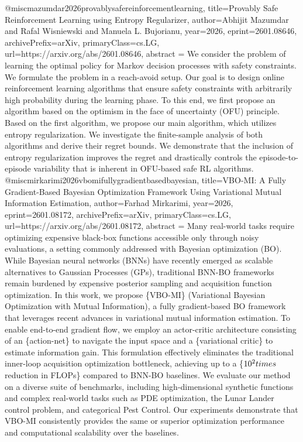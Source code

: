 {}@misc{mazumdar2026provablysafereinforcementlearning,
      title={Provably Safe Reinforcement Learning using Entropy Regularizer}, 
      author={Abhijit Mazumdar and Rafal Wisniewski and Manuela L. Bujorianu},
      year={2026},
      eprint={2601.08646},
      archivePrefix={arXiv},
      primaryClass={cs.LG},
      url={https://arxiv.org/abs/2601.08646},
      abstract = {We consider the problem of learning the optimal policy for Markov decision processes with safety constraints. We formulate the problem in a reach-avoid setup. Our goal is to design online reinforcement learning algorithms that ensure safety constraints with arbitrarily high probability during the learning phase. To this end, we first propose an algorithm based on the optimism in the face of uncertainty (OFU) principle. Based on the first algorithm, we propose our main algorithm, which utilizes entropy regularization. We investigate the finite-sample analysis of both algorithms and derive their regret bounds. We demonstrate that the inclusion of entropy regularization improves the regret and drastically controls the episode-to-episode variability that is inherent in OFU-based safe RL algorithms.}
}@misc{mirkarimi2026vbomifullygradientbasedbayesian,
      title={VBO-MI: A Fully Gradient-Based Bayesian Optimization Framework Using Variational Mutual Information Estimation}, 
      author={Farhad Mirkarimi},
      year={2026},
      eprint={2601.08172},
      archivePrefix={arXiv},
      primaryClass={cs.LG},
      url={https://arxiv.org/abs/2601.08172},
      abstract = {Many real-world tasks require optimizing expensive black-box functions accessible only through noisy evaluations, a setting commonly addressed with Bayesian optimization (BO). While Bayesian neural networks (BNNs) have recently emerged as scalable alternatives to Gaussian Processes (GPs), traditional BNN-BO frameworks remain burdened by expensive posterior sampling and acquisition function optimization. In this work, we propose \{VBO-MI\} (Variational Bayesian Optimization with Mutual Information), a fully gradient-based BO framework that leverages recent advances in variational mutual information estimation. To enable end-to-end gradient flow, we employ an actor-critic architecture consisting of an \{action-net\} to navigate the input space and a \{variational critic\} to estimate information gain. This formulation effectively eliminates the traditional inner-loop acquisition optimization bottleneck, achieving up to a \{$10^2 \\times$ reduction in FLOPs\} compared to BNN-BO baselines. We evaluate our method on a diverse suite of benchmarks, including high-dimensional synthetic functions and complex real-world tasks such as PDE optimization, the Lunar Lander control problem, and categorical Pest Control. Our experiments demonstrate that VBO-MI consistently provides the same or superior optimization performance and computational scalability over the baselines.}
}

